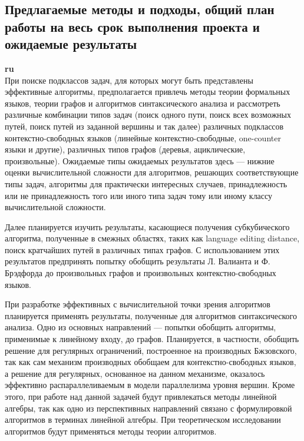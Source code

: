 \documentclass[12pt]{article}  %
\theoremstyle{remark}
\begin{document}
\subsection{Предлагаемые методы и подходы, общий план работы на весь срок выполнения проекта и ожидаемые результаты }

\textbf{ru}\\
При поиске подклассов задач, для которых могут быть представлены эффективные алгоритмы, предполагается привлечь методы теории формальных языков, теории графов и алгоритмов синтаксического анализа и рассмотреть различные комбинации типов задач (поиск одного пути, поиск всех возможных путей, поиск путей из заданной вершины и так далее) различных подклассов контекстно-свободных языков (линейные контекстно-свободные, one-counter языки и другие), различных типов графов (деревья, ациклические, произвольные).
Ожидаемые типы ожидаемых результатов здесь --- нижние оценки вычислительной сложности для алгоритмов, решающих соответствующие типы задач, алгоритмы для практически интересных случаев, принадлежность или не принадлежность того или иного типа задач тому или иному классу вычислительной сложности.

Далее планируется изучить результаты, касающиеся получения субкубического алгоритма, полученные в смежных областях, таких как language editing distance, поиск кратчайших путей в различных типах графов. С использованием этих результатов предпринять попытку обобщить результаты Л. Валианта и Ф. Брэдфорда до произвольных графов и произвольных контекстно-свободных языков.

При разработке эффективных с вычислительной точки зрения алгоритмов планируется применять результаты, полученные для алгоритмов синтаксического анализа. Одно из основных направлений --- попытки обобщить алгоритмы, применимые к линейному входу, до графов. Планируется, в частности, обобщить решение для регулярных ограничений, построенное на производных Бжзовского, так как сам механизм производных обобщаем для контекстно-свободных языков, а решение для регулярных, основанное на данном механизме, оказалось эффективно распараллеливаемым в модели параллелизма уровня вершин. Кроме этого, при работе над данной задачей будут привлекаться методы линейной алгебры, так как одно из перспективных направлений связано с формулировкой алгоритмов в терминах линейной алгебры. При теоретическом исследовании алгоритмов будут применяться методы теории алгоритмов.
\end{document}
